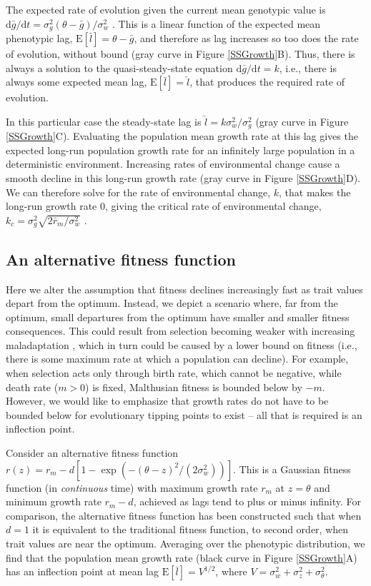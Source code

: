 \documentclass[12pt,letterpaper]{article} %
\begin{document}
The expected rate of evolution given the current mean genotypic value is $\mathrm{d}\bar{g}/\mathrm{d}t = \sigma_g^2 (\theta - \bar{g}) / \sigma_w^2$ \citep[][equation 5]{Lynch1993}.
This is a linear function of the expected mean phenotypic lag, $\mathrm{E}[\bar{l}] = \theta - \bar{g}$, and therefore as lag increases so too does the rate of evolution, without bound (gray curve in Figure \ref{SSGrowth}B).
Thus, there is always a solution to the quasi-steady-state equation $\mathrm{d}\bar{g}/\mathrm{d}t  = k$, i.e., there is always some expected mean lag, $\mathrm{E}[\bar{l}]=\hat{l}$, that produces the required rate of evolution.

In this particular case the steady-state lag is $\hat{l} = k \sigma_w^2/\sigma_g^2$ (gray curve in Figure \ref{SSGrowth}C).
Evaluating the population mean growth rate at this lag gives the expected long-run population growth rate for an infinitely large population in a deterministic environment.
Increasing rates of environmental change cause a smooth decline in this long-run growth rate (gray curve in Figure \ref{SSGrowth}D).
We can therefore solve for the rate of environmental change, $k$, that makes the long-run growth rate 0, giving the critical rate of environmental change, $k_c = \sigma_g^2 \sqrt{2\bar{r}_m/\sigma_w^2}$ \citep[][equation 11]{Lynch1993}.

\subsection*{An alternative fitness function}

Here we alter the assumption that fitness declines increasingly fast as trait values depart from the optimum. 
Instead, we depict a scenario where, far from the optimum, small departures from the optimum have smaller and smaller fitness consequences.
This could result from selection becoming weaker with increasing maladaptation \citep[for which there is some evidence;][]{Agrawal2010}, which in turn could be caused by a lower bound on fitness (i.e., there is some maximum rate at which a population can decline).
For example, when selection acts only through birth rate, which cannot be negative, while death rate ($m>0$) is fixed, Malthusian fitness is bounded below by $-m$.
However, we would like to emphasize that growth rates do not have to be bounded below for evolutionary tipping points to exist -- all that is required is an inflection point.

Consider an alternative fitness function $r(z) = r_m - d\left[1 - \exp\left(-(\theta-z)^2/(2\sigma_w^2)\right)\right]$.
This is a Gaussian fitness function (in \textit{continuous} time) with maximum growth rate $r_m$ at $z=\theta$ and minimum growth rate $r_m-d$, achieved as lags tend to plus or minus infinity.
For comparison, the alternative fitness function has been constructed such that when $d=1$ it is equivalent to the traditional fitness function, to second order, when trait values are near the optimum.
Averaging over the phenotypic distribution, we find that the population mean growth rate (black curve in Figure \ref{SSGrowth}A) has an inflection point at mean lag $\mathrm{E}[\bar{l}] = V^{1/2}$, where $V = \sigma_w^2 + \sigma_z^2 + \sigma_\theta^2$.
\end{document}
